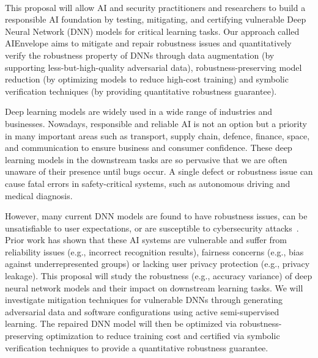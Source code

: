 \thispagestyle{empty}
 \begin{center}
{\bf \TITLE}\\
{
}
 \end{center}
\vspace{-3mm}
\noindent

This proposal will allow AI and security practitioners and researchers to build a responsible AI foundation by testing, mitigating, and certifying vulnerable Deep Neural Network (DNN) models for critical learning tasks. 
Our approach called \mbox{AIEnvelope} aims to mitigate and repair robustness issues and quantitatively verify the robustness property of DNNs through data augmentation (by supporting less-but-high-quality adversarial data), robustness-preserving model reduction (by optimizing models to reduce high-cost training) and symbolic verification techniques (by providing quantitative robustness guarantee).

Deep learning models are widely used in a wide range of industries and businesses. Nowadays, responsible and reliable AI is not an option but a priority in many important areas such as transport, supply chain, defence, finance, space, and communication to ensure business and consumer confidence. 
These deep learning models in the downstream tasks are so pervasive that we are often unaware of their presence until bugs occur. A single defect or robustness issue can cause fatal errors in safety-critical systems, such as autonomous driving and medical diagnosis.  

However, many current DNN models are found to have robustness issues, can be unsatisfiable to user expectations, or are susceptible to cybersecurity attacks~\cite{shu2020omni}. Prior work has shown that these AI systems are vulnerable and suffer from reliability issues (e.g., incorrect recognition results), fairness concerns (e.g., bias against underrepresented groups) or lacking user privacy protection (e.g., privacy leakage). 
This proposal will study the robustness (e.g., accuracy variance) of deep neural network models and their impact on downstream learning tasks. 
We will investigate mitigation techniques for vulnerable DNNs through generating adversarial data and software configurations using active semi-supervised learning. The repaired DNN model will then be optimized via robustness-preserving optimization to reduce training cost and certified via symbolic verification techniques to provide a quantitative robustness guarantee.

